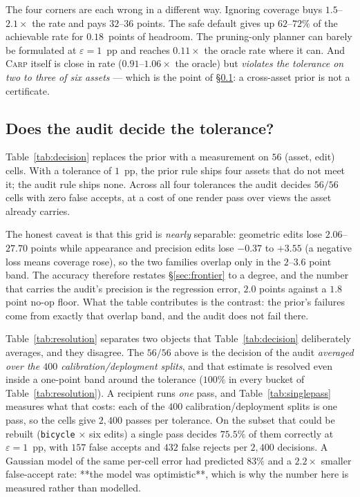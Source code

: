 \documentclass[preprint,number,3p]{elsarticle}
\newcommand{\carp}{\textsc{Carp}}
\begin{document}
The four corners are each wrong in a different way. Ignoring coverage buys $1.5$--$2.1\times$ the rate and pays
$32$--$36$ points. The safe default gives up $62$--$72\%$ of the achievable rate for $0.18$~points of headroom. The
pruning-only planner can barely be formulated at $\varepsilon = 1$~pp and reaches $0.11\times$ the oracle rate where
it can. And \carp{} itself is close in rate ($0.91$--$1.06\times$ the oracle) but \emph{violates the tolerance on
two to three of six assets} --- which is the point of \S\ref{sec:decision}: a cross-asset prior is not a
certificate.



\subsection{Does the audit decide the tolerance?}
\label{sec:decision}

Table~\ref{tab:decision} replaces the prior with a measurement on $56$ (asset, edit) cells. With a tolerance of $1$~pp,
the prior rule ships four assets that do not meet it; the audit rule ships none. Across all four tolerances the audit
decides $56/56$ cells with zero false accepts, at a cost of one render pass over views the asset already carries.

The honest caveat is that this grid is \emph{nearly} separable: geometric edits lose $2.06$--$27.70$ points while
appearance and precision edits lose $-0.37$ to $+3.55$ (a negative loss means coverage rose), so the two families
overlap only in the $2$--$3.6$ point band. The accuracy therefore restates \S\ref{sec:frontier} to a degree, and the
number that carries the audit's precision is the regression error, $2.0$ points against a $1.8$ point no-op floor.
What the table contributes is the contrast: the prior's failures come from exactly that overlap band, and the audit
does not fail there.

Table~\ref{tab:resolution} separates two objects that Table~\ref{tab:decision} deliberately averages, and they
disagree. The $56/56$ above is the decision of the audit \emph{averaged over the $400$ calibration/deployment
splits}, and that estimate is resolved even inside a one-point band around the tolerance ($100\%$ in every bucket of
Table~\ref{tab:resolution}). A recipient runs \emph{one} pass, and Table~\ref{tab:singlepass} measures what that costs: each of the $400$
calibration/deployment splits is one pass, so the cells give $2{,}400$ passes per tolerance. On the subset that
could be rebuilt (\texttt{bicycle} $\times$ six edits) a single pass decides $75.5\%$ of them correctly at
$\varepsilon=1$~pp, with $157$ false accepts and $432$ false rejects per $2{,}400$ decisions. A Gaussian model
of the same per-cell error had predicted $83\%$ and a $2.2\times$ smaller false-accept rate: **the model was
optimistic**, which is why the number here is measured rather than modelled.
\end{document}
